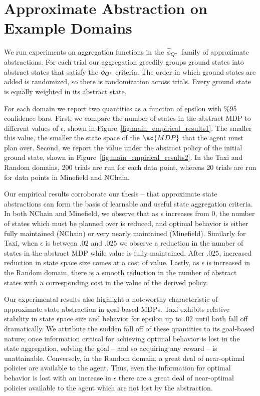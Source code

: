 \section{Approximate Abstraction on Example Domains}
We run experiments on aggregation functions in the $\widetilde \phi_{Q^*}$ family of approximate abstractions. For each trial our aggregation greedily groups ground states into abstract states that satisfy the $\widetilde \phi_{Q^*}$ criteria. The order in which ground states are added is randomized, so there is randomization across trials. Every ground state is equally weighted in its abstract state.

For each domain we report two quantities as a function of epsilon with \%95 confidence bars. First, we compare the number of states in the abstract \ac{MDP} to different values of $\epsilon$, shown in Figure~\ref{fig:main_empirical_results1}. The smaller this value, the smaller the state space of the $\ac{MDP}$ that the agent must plan over. Second, we report the value under the abstract policy of the initial ground state, shown in Figure~\ref{fig:main_empirical_results2}. In the Taxi and Random domains, 200 trials are run for each data point, whereas 20 trials are run for data points in Minefield and NChain.


Our empirical results corroborate our thesis -- that approximate state abstractions can form the basis of learnable and useful state aggregation criteria. In both NChain and Minefield, we observe that as $\epsilon$ increases from $0$, the number of states which must be planned over is reduced, and optimal behavior is either fully maintained (NChain) or very nearly maintained (Minefield). Similarly for Taxi, when $\epsilon$ is between $.02$ and $.025$ we observe a reduction in the number of states in the abstract \ac{MDP} while value is fully maintained. After $.025$, increased reduction in state space size comes at a cost of value. Lastly, as $\epsilon$ is increased in the Random domain, there is a smooth reduction in the number of abstract states with a corresponding cost in the value of the derived policy.

Our experimental results also highlight a noteworthy characteristic of approximate state abstraction in goal-based \acp{MDP}. Taxi exhibits relative stability in state space size and behavior for epsilon up to $.02$ until both fall off dramatically. We attribute the sudden fall off of these quantities to its goal-based nature; once information critical for achieving optimal behavior is lost in the state aggregation, solving the goal -- and so acquiring any reward -- is unattainable. Conversely, in the Random domain, a great deal of near-optimal policies are available to the agent. Thus, even the information for optimal behavior is lost with an increase in $\epsilon$ there are a great deal of near-optimal policies available to the agent which are not lost by the abstraction.

